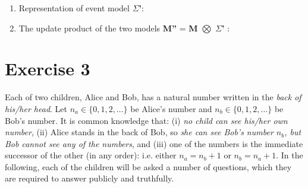 \documentclass[leqno]{article}
\begin{document}
\begin{enumerate}
\begin{center}
    \end{center}

    \item Representation of event model \textbf{$\Sigma$'}:

    \item The update product of the two models \textbf{M''} = \textbf{M}
    $\bigotimes$ \textbf{$\Sigma$'} : \\

\end{enumerate}

\newpage

\section*{Exercise 3}
Each of two children, Alice and Bob, has a natural number written in the \textit{back of his/her head}. Let $n_a \in \{0, 1, 2, \dots\}$ be Alice's number and $n_b \in \{0, 1, 2, \dots\}$ be Bob's number. It is common knowledge that: (i) \textit{no child can see his/her own number}, (ii) Alice stands in the back of Bob, so \textit{she can see Bob's number $n_b$, but Bob cannot see any of the numbers}, and (iii) one of the numbers is the immediate successor of the other (in any order): i.e. either $n_a = n_b + 1$ or $n_b = n_a + 1$.
In the following, each of the children will be asked a number of questions, which they are required to answer publicly and truthfully.
\end{document}
